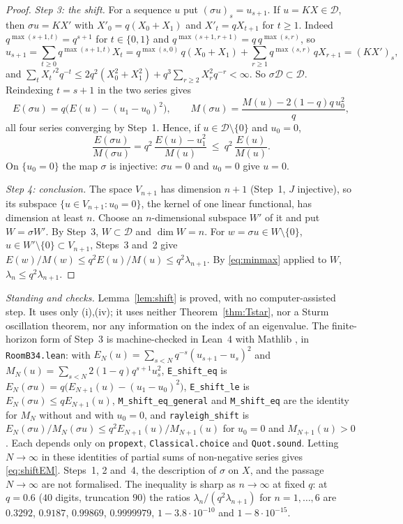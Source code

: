 \documentclass[11pt]{article}
\theoremstyle{plain}
\theoremstyle{definition}
\theoremstyle{remark}
\begin{document}
\begin{proof}
\emph{Step 3: the shift.} For a sequence $u$ put $(\sigma u)_s=u_{s+1}$. If $u=KX\in\mathcal D$,
then $\sigma u=KX'$ with $X'_0=q(X_0+X_1)$ and $X'_t=qX_{t+1}$ for $t\ge1$. Indeed
$q^{\max(s+1,t)}=q^{s+1}$ for $t\in\{0,1\}$ and $q^{\max(s+1,r+1)}=q\,q^{\max(s,r)}$, so
\[
   u_{s+1}=\sum_{t\ge0}q^{\max(s+1,t)}X_t=q^{\max(s,0)}\,q(X_0+X_1)
   +\sum_{r\ge1}q^{\max(s,r)}\,qX_{r+1}=(KX')_s ,
\]
and $\sum_tX_t'^2q^{-t}\le2q^2(X_0^2+X_1^2)+q^3\sum_{r\ge2}X_r^2q^{-r}<\infty$. So
$\sigma\mathcal D\subset\mathcal D$. Reindexing $t=s+1$ in the two series gives
\begin{equation}\label{eq:shiftEM}
   E(\sigma u)=q\bigl(E(u)-(u_1-u_0)^2\bigr),\qquad
   M(\sigma u)=\frac{M(u)-2(1-q)q\,u_0^2}{q},
\end{equation}
all four series converging by Step~1. Hence, if $u\in\mathcal D\setminus\{0\}$ and $u_0=0$,
\[
   \frac{E(\sigma u)}{M(\sigma u)}=q^2\,\frac{E(u)-u_1^2}{M(u)}\ \le\ q^2\,\frac{E(u)}{M(u)} .
\]
On $\{u_0=0\}$ the map $\sigma$ is injective: $\sigma u=0$ and $u_0=0$ give $u=0$.

\emph{Step 4: conclusion.} The space $V_{n+1}$ has dimension $n+1$ (Step~1, $J$ injective), so its
subspace $\{u\in V_{n+1}:u_0=0\}$, the kernel of one linear functional, has dimension at least $n$.
Choose an $n$-dimensional subspace $W'$ of it and put $W=\sigma W'$. By Step~3, $W\subset\mathcal D$
and $\dim W=n$. For $w=\sigma u\in W\setminus\{0\}$, $u\in W'\setminus\{0\}\subset V_{n+1}$, Steps~3
and~2 give $E(w)/M(w)\le q^2E(u)/M(u)\le q^2\lambda_{n+1}$. By \eqref{eq:minmax} applied to $W$,
$\lambda_n\le q^2\lambda_{n+1}$.
\end{proof}

\noindent\emph{Standing and checks.} Lemma~\ref{lem:shift} is proved, with no computer-assisted
step. It uses only {\cite[Theorem ``the travel determinant'', \textup{thm:fredholm}]{Bonfioli2026bA}}\textup{(i)},\textup{(iv)};
it uses neither Theorem~\ref{thm:Tstar}, nor a Sturm oscillation theorem, nor any information on the
index of an eigenvalue. The finite-horizon form of Step~3 is machine-checked in Lean~4 with Mathlib
\cite{MathlibCommunity}, in \texttt{RoomB34.lean}: with $E_N(u)=\sum_{s<N}q^{-s}(u_{s+1}-u_s)^2$ and
$M_N(u)=\sum_{s<N}2(1-q)q^{s+1}u_s^2$, \texttt{E\_shift\_eq} is
$E_N(\sigma u)=q\bigl(E_{N+1}(u)-(u_1-u_0)^2\bigr)$, \texttt{E\_shift\_le} is
$E_N(\sigma u)\le qE_{N+1}(u)$, \texttt{M\_shift\_eq\_general} and \texttt{M\_shift\_eq} are the
identity for $M_N$ without and with $u_0=0$, and \texttt{rayleigh\_shift} is
$E_N(\sigma u)/M_N(\sigma u)\le q^2E_{N+1}(u)/M_{N+1}(u)$ for $u_0=0$ and $M_{N+1}(u)>0$. Each
depends only on \texttt{propext}, \texttt{Classical.choice} and \texttt{Quot.sound}. Letting
$N\to\infty$ in these identities of partial sums of non-negative series gives \eqref{eq:shiftEM}.
Steps~1, 2 and~4, the description of $\sigma$ on $X$, and the passage $N\to\infty$ are not
formalised. The inequality is sharp as $n\to\infty$ at fixed $q$: at $q=0.6$ ($40$ digits, truncation
$90$) the ratios $\lambda_n/(q^2\lambda_{n+1})$ for $n=1,\dots,6$ are $0.3292$, $0.9187$,
$0.99869$, $0.9999979$, $1-3.8\cdot10^{-10}$ and $1-8\cdot10^{-15}$.
\end{document}
